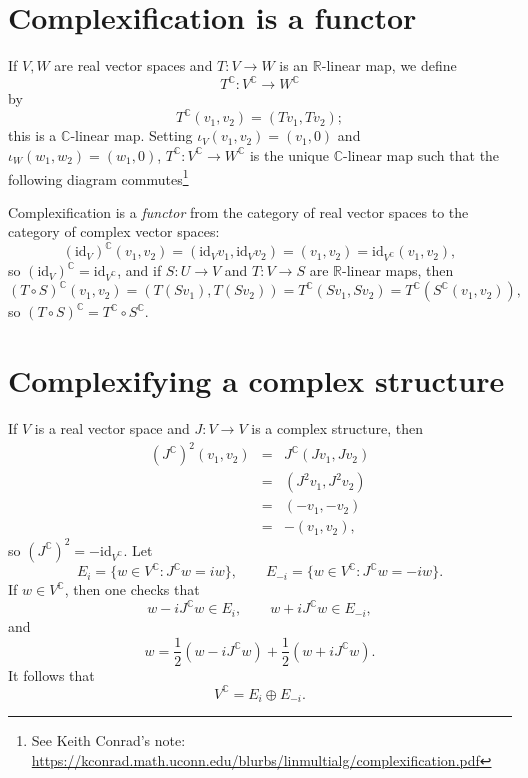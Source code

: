 \documentclass{article}
\newcommand{\id}{\textrm{id}}
\begin{document}
\section{Complexification is a functor}
If $V,W$ are real vector spaces and $T:V \to W$ is an $\mathbb{R}$-linear map, we define 
\[
T^\mathbb{C}:V^\mathbb{C} \to W^\mathbb{C}
\]
by 
\[
T^\mathbb{C}(v_1,v_2)=(Tv_1,Tv_2);
\]
this is a $\mathbb{C}$-linear map.
Setting $\iota_V(v_1,v_2)=(v_1,0)$ and $\iota_W(w_1,w_2)=(w_1,0)$, $T^\mathbb{C}:V^\mathbb{C} \to W^\mathbb{C}$ is
the unique $\mathbb{C}$-linear map
such that the following diagram commutes\footnote{See Keith Conrad's note: \url{https://kconrad.math.uconn.edu/blurbs/linmultialg/complexification.pdf}}
\begin{center}
\end{center}
Complexification is a {\em  functor} from the category of real vector spaces to the category of complex vector spaces: 
\[
(\id_V)^\mathbb{C}(v_1,v_2)=(\id_V v_1, \id_V v_2)=(v_1,v_2)=\id_{V^\mathbb{C}}(v_1,v_2),
\]
so $(\id_V)^\mathbb{C}=\id_{V^\mathbb{C}}$, and if $S:U \to V$ and $T:V \to S$ are $\mathbb{R}$-linear maps, then 
\[
(T \circ S)^\mathbb{C}(v_1,v_2)=(T(Sv_1),T(Sv_2))=
T^\mathbb{C}(Sv_1,Sv_2)=T^\mathbb{C}(S^\mathbb{C}(v_1,v_2)),
\]
so $(T \circ S)^\mathbb{C} =  T^\mathbb{C} \circ
S^\mathbb{C}$.




\section{Complexifying a complex structure}
If $V$ is a real vector space and $J:V \to V$ is a complex structure, then
\begin{eqnarray*}
(J^\mathbb{C})^2(v_1,v_2)&=&J^\mathbb{C}(Jv_1,Jv_2)\\
&=&(J^2v_1,J^2v_2)\\
&=&(-v_1,-v_2)\\
&=&-(v_1,v_2),
\end{eqnarray*}
so $(J^\mathbb{C})^2=-\id_{V^\mathbb{C}}$. 
Let
\[
E_i=\{w \in V^\mathbb{C}:J^\mathbb{C}w=iw\}, \qquad E_{-i}=\{w \in V^\mathbb{C}:
J^\mathbb{C}w=-iw\}.
\]
If $w \in V^\mathbb{C}$, then one checks that
\[
w-iJ^\mathbb{C} w \in E_i, \qquad w+iJ^\mathbb{C}w \in E_{-i},
\]
and 
\[
w=\frac{1}{2}\left(w-iJ^\mathbb{C} w\right)+\frac{1}{2}\left(w+iJ^\mathbb{C}w\right).
\]
It follows that
\[
V^\mathbb{C}=E_i \oplus E_{-i}.
\]
\end{document}
